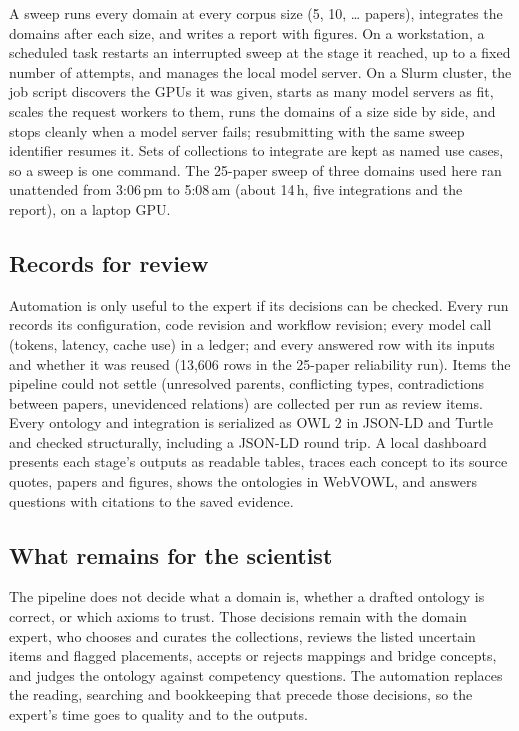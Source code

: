 A sweep runs every domain at every corpus size (5, 10, \ldots{} papers), integrates the domains after each size, and writes a report with figures. On a workstation, a scheduled task restarts an interrupted sweep at the stage it reached, up to a fixed number of attempts, and manages the local model server. On a Slurm cluster, the job script discovers the GPUs it was given, starts as many model servers as fit, scales the request workers to them, runs the domains of a size side by side, and stops cleanly when a model server fails; resubmitting with the same sweep identifier resumes it. Sets of collections to integrate are kept as named use cases, so a sweep is one command. The 25-paper sweep of three domains used here ran unattended from 3:06\,pm to 5:08\,am (about 14\,h, five integrations and the report), on a laptop GPU.

\subsection{Records for review}

Automation is only useful to the expert if its decisions can be checked. Every run records its configuration, code revision and workflow revision; every model call (tokens, latency, cache use) in a ledger; and every answered row with its inputs and whether it was reused (13,606 rows in the 25-paper reliability run). Items the pipeline could not settle (unresolved parents, conflicting types, contradictions between papers, unevidenced relations) are collected per run as review items. Every ontology and integration is serialized as OWL 2 in JSON-LD and Turtle and checked structurally, including a JSON-LD round trip. A local dashboard presents each stage's outputs as readable tables, traces each concept to its source quotes, papers and figures, shows the ontologies in WebVOWL, and answers questions with citations to the saved evidence.

\subsection{What remains for the scientist}

The pipeline does not decide what a domain is, whether a drafted ontology is correct, or which axioms to trust. Those decisions remain with the domain expert, who chooses and curates the collections, reviews the listed uncertain items and flagged placements, accepts or rejects mappings and bridge concepts, and judges the ontology against competency questions. The automation replaces the reading, searching and bookkeeping that precede those decisions, so the expert's time goes to quality and to the outputs. %
